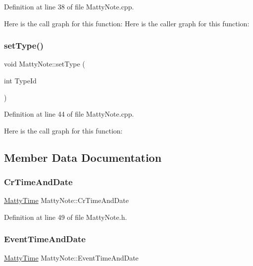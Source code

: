 Definition at line 38 of file Matty\+Note.\+cpp.

Here is the call graph for this function\+:
Here is the caller graph for this function\+:
\hypertarget{classMattyNote_a8ae86d728b9cb64fa78042a09cb5aa70}{}\label{classMattyNote_a8ae86d728b9cb64fa78042a09cb5aa70} 
\subsubsection{\texorpdfstring{set\+Type()}{setType()}\hspace{0.1cm}{\footnotesize\ttfamily [2/2]}}
{\footnotesize\ttfamily void Matty\+Note\+::set\+Type (\begin{DoxyParamCaption}\item[{int}]{Type\+Id }\end{DoxyParamCaption})}



Definition at line 44 of file Matty\+Note.\+cpp.

Here is the call graph for this function\+:


\subsection{Member Data Documentation}
\hypertarget{classMattyNote_ae2959e86661be06281c70a5b87390587}{}\label{classMattyNote_ae2959e86661be06281c70a5b87390587} 
\subsubsection{\texorpdfstring{Cr\+Time\+And\+Date}{CrTimeAndDate}}
{\footnotesize\ttfamily \hyperlink{classMattyTime}{Matty\+Time} Matty\+Note\+::\+Cr\+Time\+And\+Date\hspace{0.3cm}{\ttfamily [private]}}



Definition at line 49 of file Matty\+Note.\+h.

\hypertarget{classMattyNote_a1f870bad84b62162b8ee07bff70e3003}{}\label{classMattyNote_a1f870bad84b62162b8ee07bff70e3003} 
\subsubsection{\texorpdfstring{Event\+Time\+And\+Date}{EventTimeAndDate}}
{\footnotesize\ttfamily \hyperlink{classMattyTime}{Matty\+Time} Matty\+Note\+::\+Event\+Time\+And\+Date\hspace{0.3cm}{\ttfamily [private]}}



